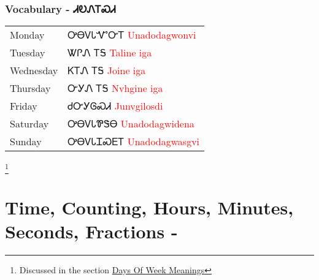\subsection{Vocabulary - ᏗᎧᏁᎢᏍᏗ 
}
\begin{minipage}{\linewidth}
\begin{tabular}{p{5cm} p{9cm}}
Monday & ᎤᎾᏙᏓᏉᏅᎢ 
 \newline \textcolor{red}{Unadodagwonvi}\\
Tuesday & ᏔᎵᏁ ᎢᎦ 
 \newline \textcolor{red}{Taline iga}\\
Wednesday & ᏦᎢᏁ ᎢᎦ 
 \newline \textcolor{red}{Joine iga}\\
Thursday & ᏅᎩᏁ ᎢᎦ 
 \newline \textcolor{red}{Nvhgine iga}\\
Friday & ᏧᏅᎩᎶᏍᏗ 
 \newline \textcolor{red}{Junvgilosdi}\\
Saturday & ᎤᎾᏙᏓᏈᏕᎾ 
 \newline \textcolor{red}{Unadodagwidena}\\
Sunday & ᎤᎾᏙᏓᏆᏍᎬᎢ 
 \newline \textcolor{red}{Unadodagwasgvi}\\
\end{tabular}
\end{minipage}

\footnote{Discussed in the section \hyperref[sec:daysOfWeekMeaning]{Days Of Week Meanings}}
\index{}
\chapter*{Time, Counting, Hours, Minutes, Seconds, Fractions - }
